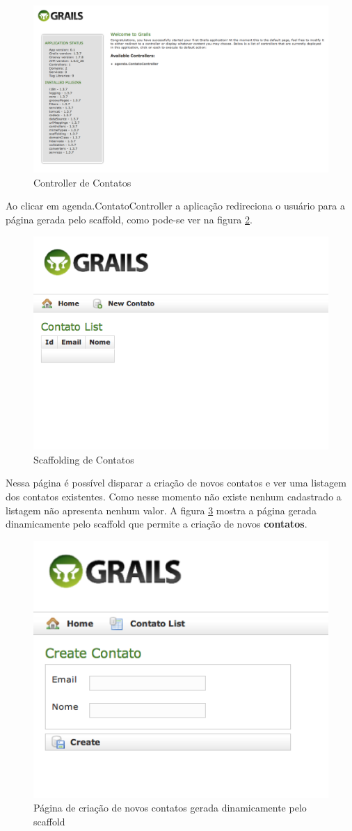 \documentclass[12pt]{article}
\begin{document}
    \begin{figure}[h!]
       \centering
       \includegraphics[width=1\textwidth]{images/contactControllerScaffold.png}
       \caption{Controller de Contatos}
       \label{fig:contactScaffold1}
   \end{figure}
   
   Ao clicar em agenda.ContatoController a aplicação redireciona o usuário para
   a página gerada pelo scaffold, como pode-se ver na figura \ref{fig:contactScaffold2}.
   
   \begin{figure}[h!]
      \centering
      \includegraphics[width=.4\textwidth]{images/contactControllerScaffold2.png}
      \caption{Scaffolding de Contatos}
      \label{fig:contactScaffold2}
  \end{figure}
  
  Nessa página é possível disparar a criação de novos contatos e ver uma listagem
  dos contatos existentes. Como nesse momento não existe nenhum cadastrado a listagem
  não apresenta nenhum valor. A figura \ref{fig:createContactScaffold} mostra a 
  página gerada dinamicamente pelo scaffold que permite a criação de novos \textbf{contatos}.
  
   \begin{figure}[h!]
      \centering
      \includegraphics[width=.4\textwidth]{images/createContactScaffold.png}
      \caption{Página de criação de novos contatos gerada dinamicamente pelo scaffold}
      \label{fig:createContactScaffold}
  \end{figure}
  
\end{document}
